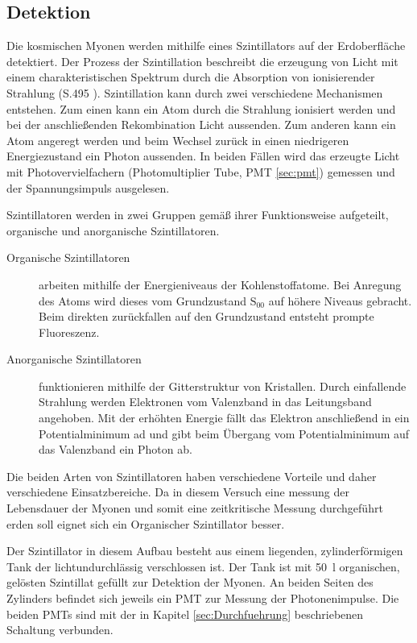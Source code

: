 \subsection{Detektion}
\label{sec:szintillator}
Die kosmischen Myonen werden mithilfe eines Szintillators auf der Erdoberfläche detektiert.
Der Prozess der Szintillation beschreibt die erzeugung von Licht mit einem charakteristischen Spektrum durch die Absorption von ionisierender Strahlung (S.\num{495} \cite{source2}).
Szintillation kann durch zwei verschiedene Mechanismen entstehen. 
Zum einen kann ein Atom durch die Strahlung ionisiert werden und bei der anschließenden Rekombination Licht aussenden.
Zum anderen kann ein Atom angeregt werden und beim Wechsel zurück in einen niedrigeren Energiezustand ein Photon aussenden.
In beiden Fällen wird das erzeugte Licht mit Photovervielfachern (Photomultiplier Tube, PMT \ref{sec:pmt}) gemessen und der Spannungsimpuls ausgelesen.

Szintillatoren werden in zwei Gruppen gemäß ihrer Funktionsweise aufgeteilt, organische und anorganische Szintillatoren.

\begin{description}
    \item[Organische Szintillatoren] arbeiten mithilfe der Energieniveaus der Kohlenstoffatome. Bei Anregung des Atoms wird dieses vom Grundzustand $\text{S}_{00}$ auf höhere Niveaus gebracht. Beim direkten zurückfallen auf den Grundzustand entsteht prompte Fluoreszenz.
    \item[Anorganische Szintillatoren] funktionieren mithilfe der Gitterstruktur von Kristallen. Durch einfallende Strahlung werden Elektronen vom Valenzband in das Leitungsband angehoben. Mit der erhöhten Energie fällt das Elektron anschließend in ein Potentialminimum ad und gibt beim Übergang vom Potentialminimum auf das Valenzband ein Photon ab. 
\end{description}

Die beiden Arten von Szintillatoren haben verschiedene Vorteile und daher verschiedene Einsatzbereiche.
Da in diesem Versuch eine messung der Lebensdauer der Myonen und somit eine zeitkritische Messung durchgeführt erden soll eignet sich ein Organischer Szintillator besser.

Der Szintillator in diesem Aufbau besteht aus einem liegenden, zylinderförmigen Tank der lichtundurchlässig verschlossen ist.
Der Tank ist mit \SI{50}{\litre} organischen, gelösten Szintillat gefüllt zur Detektion der Myonen.
An beiden Seiten des Zylinders befindet sich jeweils ein PMT zur Messung der Photonenimpulse.
Die beiden PMTs sind mit der in Kapitel \ref{sec:Durchfuehrung} beschriebenen Schaltung verbunden.

